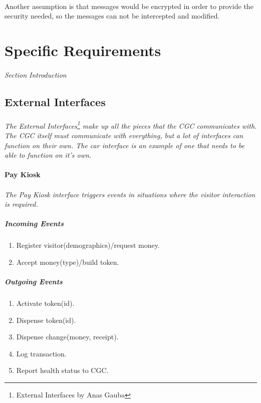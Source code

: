 \documentclass[12pt]{article}
\begin{document}
	\paragraph{} Another assumption is that messages would be encrypted in order 
	to provide the security needed, so the messages can not be intercepted and 
	modified.

\section{Specific Requirements} \label{spec} %
\paragraph{} \textit{Section Introduction}

	\subsection{External Interfaces} \label{inter}%
	\paragraph{} \textit{The External Interfaces\footnote{External Interfaces by Anas Gauba} 
	make up all the pieces that the CGC communicates with. The CGC itself must 
	communicate with everything, 	but a lot of interfaces can function on their own. The 
	car interface is an example of one that needs to be able to function on it's own.}
		
	\paragraph{Pay Kiosk}
	\paragraph {}\textit{The Pay Kiosk interface triggers events in situations where the visitor interaction is required.  }
	    \subparagraph{Incoming Events}
		\begin{enumerate}
		    \item Register visitor(demographics)/request money.
		    \item Accept money(type)/build token.
		\end{enumerate}
				
	    \subparagraph{Outgoing Events}
		\begin{enumerate}
            \item Activate token(id).
            \item Dispense token(id). 
            \item Dispense change(money, receipt).
            \item Log transaction. 
            \item Report health status to CGC. 
		\end{enumerate}
\end{document}
